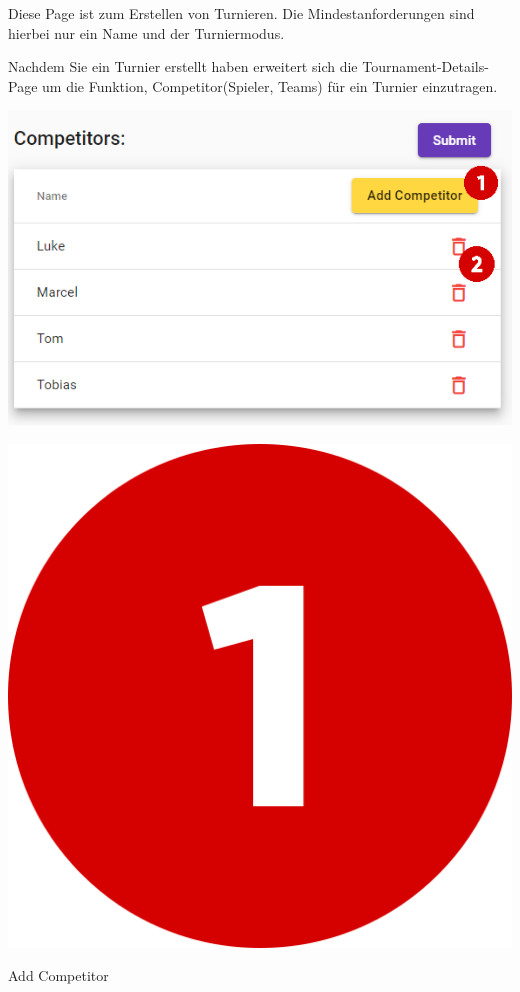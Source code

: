 Diese Page ist zum Erstellen von Turnieren. Die Mindestanforderungen
sind hierbei nur ein Name und der Turniermodus.

Nachdem Sie ein Turnier erstellt haben erweitert sich die Tournament-Details-Page um die Funktion, Competitor(Spieler, Teams) für ein Turnier einzutragen.

\includegraphics[scale=0.5]{pics/user-guide/tournament-add-player.PNG}

\includegraphics[scale=0.05]{pics/user-guide/numbers/number-1.png} \begin{LARGE} Add Competitor \end{LARGE}

